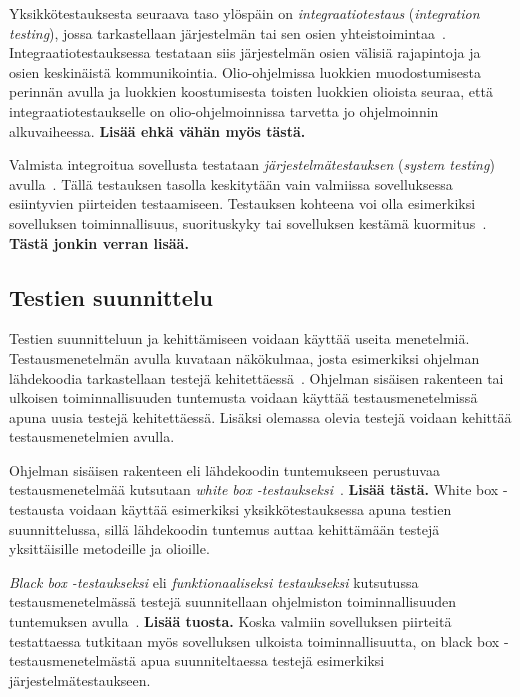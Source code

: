 \documentclass[finnish, grading]{tktltiki2}
\theoremstyle{definition}
\theoremstyle{remark}
\begin{document}
Yksikkötestauksesta seuraava taso ylöspäin on \textit{integraatiotestaus} (\textit{integration testing}), jossa tarkastellaan järjestelmän tai sen osien yhteistoimintaa~\cite[s. 45]{Binder:1999}. Integraatiotestauksessa testataan siis järjestelmän osien välisiä rajapintoja ja osien keskinäistä kommunikointia. Olio-ohjelmissa luokkien muodostumisesta perinnän avulla ja luokkien koostumisesta toisten luokkien olioista seuraa, että integraatiotestaukselle on olio-ohjelmoinnissa tarvetta jo ohjelmoinnin alkuvaiheessa. 
\textbf{Lisää ehkä vähän myös tästä.}

Valmista integroitua sovellusta testataan \textit{järjestelmätestauksen} (\textit{system testing}) avulla~\cite[s. 45]{Binder:1999}. Tällä testauksen tasolla keskitytään vain valmiissa sovelluksessa esiintyvien piirteiden testaamiseen. Testauksen kohteena voi olla esimerkiksi sovelluksen toiminnallisuus, suorituskyky tai sovelluksen kestämä kuormitus~\cite[s. 45]{Binder:1999}. 
\textbf{Tästä jonkin verran lisää.}

\subsection{Testien suunnittelu}

Testien suunnitteluun ja kehittämiseen voidaan käyttää useita menetelmiä. Testausmenetelmän avulla kuvataan näkökulmaa, josta esimerkiksi ohjelman lähdekoodia tarkastellaan testejä kehitettäessä~\cite[s. 51]{Binder:1999}. Ohjelman sisäisen rakenteen tai ulkoisen toiminnallisuuden tuntemusta voidaan käyttää testausmenetelmissä apuna uusia testejä kehitettäessä. Lisäksi olemassa olevia testejä voidaan kehittää testausmenetelmien avulla.

Ohjelman sisäisen rakenteen eli lähdekoodin tuntemukseen perustuvaa testausmenetelmää kutsutaan \textit{white box -testaukseksi}~\cite[s. 52]{Binder:1999}. \textbf{Lisää tästä.} White box -testausta voidaan käyttää esimerkiksi yksikkötestauksessa apuna testien suunnittelussa, sillä lähdekoodin tuntemus auttaa kehittämään testejä yksittäisille metodeille ja olioille.

\textit{Black box -testaukseksi} eli \textit{funktionaaliseksi testaukseksi} kutsutussa testausmenetelmässä testejä suunnitellaan ohjelmiston toiminnallisuuden tuntemuksen avulla~\cite[s. 52]{Binder:1999}. \textbf{Lisää tuosta.} Koska valmiin sovelluksen piirteitä testattaessa tutkitaan myös sovelluksen ulkoista toiminnallisuutta, on black box -testausmenetelmästä apua suunniteltaessa testejä esimerkiksi järjestelmätestaukseen.
\end{document}
